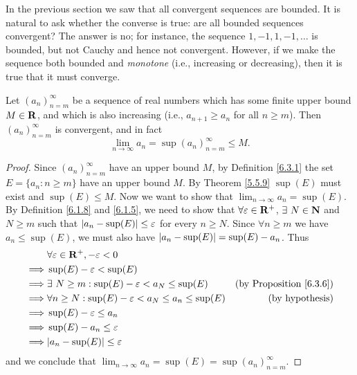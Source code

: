 \begin{note}
    In the previous section we saw that all convergent sequences are bounded.
    It is natural to ask whether the converse is true:
    are all bounded sequences convergent?
    The answer is no;
    for instance, the sequence \(1, -1, 1, -1, \dots\) is bounded, but not Cauchy and hence not convergent.
    However, if we make the sequence both bounded and \emph{monotone} (i.e., increasing or decreasing), then it is true that it must converge.
\end{note}

\begin{proposition}\label{6.3.8}
    Let \((a_n)_{n = m}^\infty\) be a sequence of real numbers which has some finite upper bound \(M \in \mathbf{R}\), and which is also increasing (i.e., \(a_{n + 1} \geq a_n\) for all \(n \geq m\)).
    Then \((a_n)_{n = m}^\infty\) is convergent, and in fact
    \[
        \lim_{n \to \infty} a_n = \sup(a_n)_{n = m}^\infty \leq M.
    \]
\end{proposition}

\begin{proof}
    Since \((a_n)_{n = m}^\infty\) have an upper bound \(M\), by Definition \ref{6.3.1} the set \(E = \{a_n : n \geq m\}\) have an upper bound \(M\).
    By Theorem \ref{5.5.9} \(\sup(E)\) must exist and \(\sup(E) \leq M\).
    Now we want to show that \(\lim_{n \to \infty} a_n = \sup(E)\).
    By Definition \ref{6.1.8} and \ref{6.1.5}, we need to show that \(\forall \varepsilon \in \mathbf{R}^+\), \(\exists\ N \in \mathbf{N}\) and \(N \geq m\) such that \(\left\lvert a_n - \sup(E)\right\rvert \leq \varepsilon\) for every \(n \geq N\).
    Since \(\forall n \geq m\) we have \(a_n \leq \sup(E)\), we must also have \(\left\lvert a_n - \sup(E)\right\rvert = \sup(E) - a_n\).
    Thus
    \begin{align*}
                 & \forall \varepsilon \in \R^+, -\varepsilon < 0                                                             \\
        \implies & \sup(E) - \varepsilon < \sup(E)                                                                            \\
        \implies & \exists\ N \geq m : \sup(E) - \varepsilon < a_N \leq \sup(E)         & \text{(by Proposition \ref{6.3.6})} \\
        \implies & \forall n \geq N : \sup(E) - \varepsilon < a_N \leq a_n \leq \sup(E) & \text{(by hypothesis)}              \\
        \implies & \sup(E) - \varepsilon \leq a_n                                                                             \\
        \implies & \sup(E) - a_n \leq \varepsilon                                                                             \\
        \implies & \abs{a_n - \sup(E)} \leq \varepsilon
    \end{align*}
    and we conclude that \(\lim_{n \to \infty} a_n = \sup(E) = \sup(a_n)_{n = m}^\infty\).
\end{proof}

